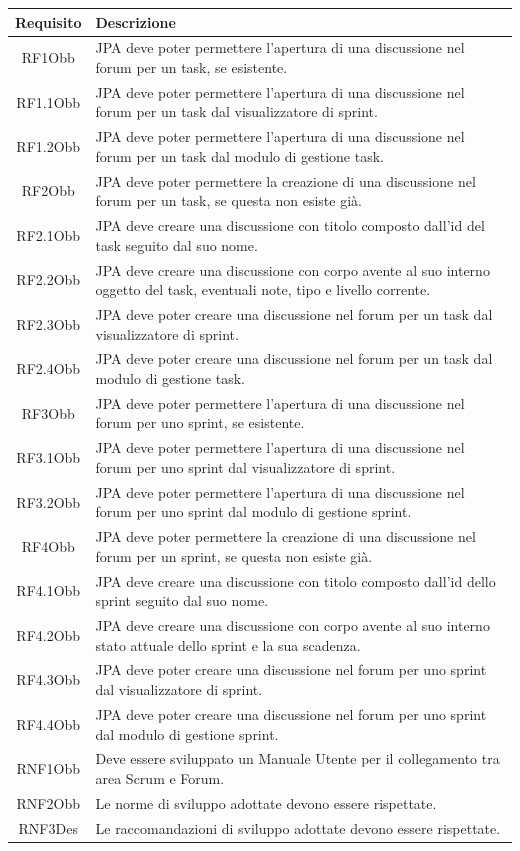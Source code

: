 \begin{tabular}{| c | p{10cm} |}

\hline
\textbf{Requisito} & \textbf{Descrizione} \\
\hline
RF1Obb &
JPA deve poter permettere l'apertura di una discussione nel forum per un task,
se esistente. \\
\hline
RF1.1Obb &
JPA deve poter permettere l'apertura di una discussione nel forum per un task
dal visualizzatore di sprint. \\
\hline
RF1.2Obb &
JPA deve poter permettere l'apertura di una discussione nel forum per un task
dal modulo di gestione task. \\
\hline
RF2Obb &
JPA deve poter permettere la creazione di una discussione nel forum per un
task, se questa non esiste già. \\
\hline
RF2.1Obb &
JPA deve creare una discussione con titolo composto dall'id del task seguito
dal suo nome. \\
\hline
RF2.2Obb &
JPA deve creare una discussione con corpo avente al suo interno oggetto del
task, eventuali note, tipo e livello corrente. \\
\hline
RF2.3Obb &
JPA deve poter creare una discussione nel forum per un task dal visualizzatore
di sprint. \\
\hline
RF2.4Obb &
JPA deve poter creare una discussione nel forum per un task dal modulo di
gestione task. \\
\hline
RF3Obb &
JPA deve poter permettere l'apertura di una discussione nel forum per uno
sprint, se esistente. \\
\hline
RF3.1Obb &
JPA deve poter permettere l'apertura di una discussione nel forum per uno
sprint dal visualizzatore di sprint. \\
\hline
RF3.2Obb &
JPA deve poter permettere l'apertura di una discussione nel forum per uno
sprint dal modulo di gestione sprint. \\
\hline
RF4Obb &
JPA deve poter permettere la creazione di una discussione nel forum per un
sprint, se questa non esiste già. \\
\hline
RF4.1Obb &
JPA deve creare una discussione con titolo composto dall'id dello sprint
seguito dal suo nome. \\
\hline
RF4.2Obb &
JPA deve creare una discussione con corpo avente al suo interno stato attuale
dello sprint e la sua scadenza. \\
\hline
RF4.3Obb &
JPA deve poter creare una discussione nel forum per uno sprint dal
visualizzatore di sprint. \\
\hline
RF4.4Obb &
JPA deve poter creare una discussione nel forum per uno sprint dal modulo
di gestione sprint. \\
\hline
RNF1Obb &
Deve essere sviluppato un Manuale Utente per il collegamento tra area Scrum e
Forum. \\
\hline
RNF2Obb &
Le norme di sviluppo adottate devono essere rispettate.
\\
\hline
RNF3Des &
Le raccomandazioni di sviluppo adottate devono essere rispettate. \\
\hline
\end{tabular}
\label{tab:requisiti-forum}

